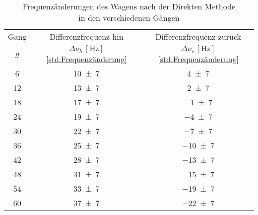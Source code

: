 \begin{table}[!h]
	\centering
	\begin{tabular}{|c|c|c|}
		\hline
		Gang & Differenzfrequenz hin & Differenzfrequenz zurück\\
		$g$ & $\Delta \nu_{h}\,[\si{\hertz}]$\cref{std:Frequenzänderung} & $\Delta \nu_{r}\,[\si{\hertz}]$\cref{std:Frequenzänderung}\\\hline\hline
		\num{6}  & \num{10(7)}  & \num{4(7)} \\
		\num{12}  & \num{13(7)}  & \num{2(7)} \\
		\num{18}  & \num{17(7)}  & \num{-1(7)} \\
		\num{24}  & \num{19(7)}  & \num{-4(7)} \\
		\num{30}  & \num{22(7)}  & \num{-7(7)} \\
		\num{36}  & \num{25(7)}  & \num{-10(7)} \\
		\num{42}  & \num{28(7)}  & \num{-13(7)} \\
		\num{48}  & \num{31(7)}  & \num{-15(7)} \\
		\num{54}  & \num{33(7)}  & \num{-19(7)} \\
		\num{60}  & \num{37(7)}  & \num{-22(7)} \\
		\hline
	\end{tabular}
	\caption{Frequenzänderungen des Wagens nach der Direkten Methode\\ \hspace*{1.95cm} in den verschiedenen Gängen \label{tab:Auswertung_Frequenzänderung_Direkt}}
\end{table}